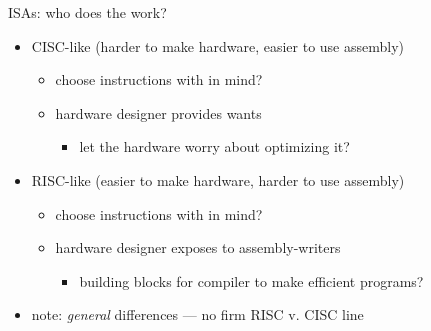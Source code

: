 \begin{frame}{ISAs: who does the work?}
\begin{itemize}
\item CISC-like (harder to make hardware, easier to use assembly)
    \begin{itemize}
    \item choose instructions with  in mind?
    \item hardware designer provides  wants
        \begin{itemize}
        \item let the hardware worry about optimizing it?
        \end{itemize}
    \end{itemize}
\item RISC-like (easier to make hardware, harder to use assembly)
    \begin{itemize}
    \item choose instructions with  in mind?
    \item hardware designer exposes  to assembly-writers
        \begin{itemize}
        \item building blocks for compiler to make efficient programs?
        \end{itemize}
    \end{itemize}
\vspace{.5cm}
\item note: \textit{general} differences --- no firm RISC v. CISC line
\end{itemize}
\end{frame}

